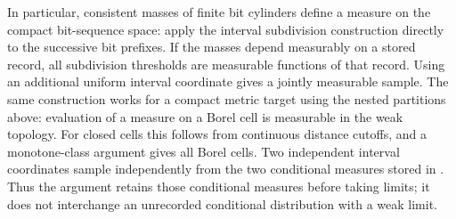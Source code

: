 In particular, consistent masses of finite bit cylinders define a
measure on the compact bit-sequence space: apply the interval
subdivision construction directly to the successive bit prefixes.
If the masses depend measurably on a stored record, all subdivision
thresholds are measurable functions of that record. Using an additional
uniform interval coordinate gives a jointly measurable sample. The same
construction works for a compact metric target using the nested
partitions above: evaluation of a measure on a Borel cell is measurable
in the weak topology. For closed cells this follows from continuous
distance cutoffs, and a monotone-class argument gives all Borel cells. Two
independent interval coordinates sample independently from the two
conditional measures stored in . Thus the argument
retains those conditional measures before taking limits; it does not
interchange an unrecorded conditional distribution with a weak limit.

